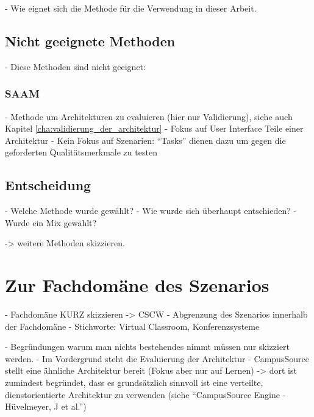  - Wie eignet sich die Methode für die Verwendung in dieser Arbeit.



\subsection{Nicht geeignete Methoden} %
\label{sub:nicht_geeignete_methoden}

  - Diese Methoden sind nicht geeignet:
  
\subsubsection{SAAM} %
\label{ssub:saam}

  - Methode um Architekturen zu evaluieren (hier nur Validierung), siehe auch Kapitel \ref{cha:validierung_der_architektur}
  - Fokus auf User Interface Teile einer Architektur
  - Kein Fokus auf Szenarien: "`Tasks"' dienen dazu um gegen die geforderten Qualitätsmerkmale zu testen~\citep[S. 82]{saam}



\subsection{Entscheidung} %
\label{sub:entscheidung}

  - Welche Methode wurde gewählt?
  - Wie wurde sich überhaupt entschieden?
  - Wurde ein Mix gewählt?


 -> weitere Methoden skizzieren.


\section{Zur Fachdomäne des Szenarios} %
\label{sec:zur_fachdomaene_des_szenarios}

- Fachdomäne KURZ skizzieren -> CSCW
- Abgrenzung des Szenarios innerhalb der Fachdomäne
- Stichworte: Virtual Classroom, Konferenzsysteme

- Begründungen warum man nichts bestehendes nimmt müssen nur skizziert werden.
  - Im Vordergrund steht die Evaluierung der Architektur
  - CampusSource stellt eine ähnliche Architektur bereit (Fokus aber nur auf Lernen) -> dort ist zumindest begründet, dass es grundsätzlich sinnvoll ist eine verteilte, dienstorientierte Architektur zu verwenden (siehe "`CampusSource Engine - Hüvelmeyer, J et al."')

